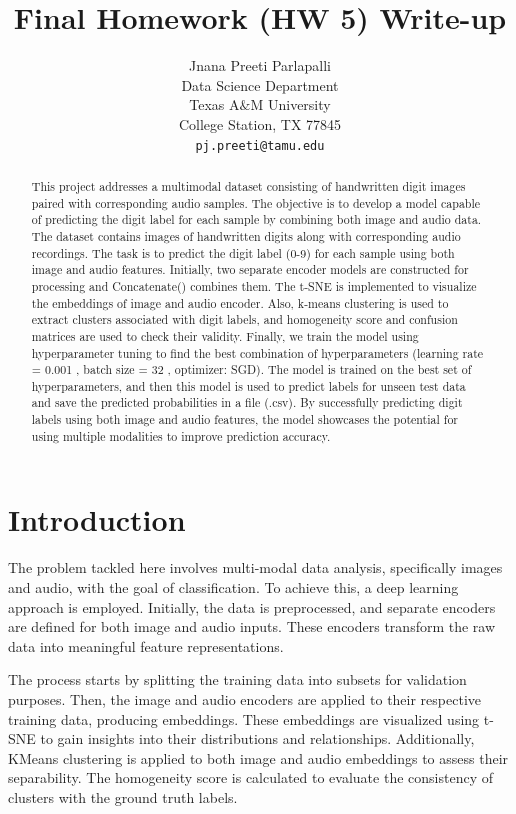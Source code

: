 \documentclass{article}
\title{Final Homework (HW 5) Write-up}
\author{%
  Jnana  Preeti Parlapalli \\
  Data Science Department\\
  Texas A$\&$M University\\
  College Station, TX 77845 \\
  \texttt{pj.preeti@tamu.edu} \\
}
\begin{document}
\maketitle


\begin{abstract}
  This project addresses a multimodal dataset consisting of handwritten digit images paired with corresponding audio samples. The objective is to develop a model capable of predicting the digit label for each sample by combining both image and audio data. The dataset contains images of handwritten digits along with corresponding audio recordings. The task is to predict the digit label (0-9) for each sample using both image and audio features. Initially, two separate encoder models are constructed for processing and  Concatenate() combines them. The t-SNE is implemented to visualize the embeddings of image and audio encoder. Also, k-means clustering is used to extract clusters associated with digit labels, and homogeneity score and confusion matrices are used to check their validity. Finally, we train the model using hyperparameter tuning to find the best combination of hyperparameters (learning rate = 0.001 , batch size = 32 , optimizer: SGD). The model is trained on the best set of hyperparameters, and then this model is used to predict labels for unseen test data and save the predicted probabilities in a file (.csv). By successfully predicting digit labels using both image and audio features, the model showcases the potential for using multiple modalities to improve prediction accuracy.
\end{abstract}


\section{Introduction}

The problem tackled here involves multi-modal data analysis, specifically images and audio, with the goal of classification. To achieve this, a deep learning approach is employed. Initially, the data is preprocessed, and separate encoders are defined for both image and audio inputs. These encoders transform the raw data into meaningful feature representations.

The process starts by splitting the training data into subsets for validation purposes. Then, the image and audio encoders are applied to their respective training data, producing embeddings. These embeddings are visualized using t-SNE to gain insights into their distributions and relationships. Additionally, KMeans clustering is applied to both image and audio embeddings to assess their separability. The homogeneity score is calculated to evaluate the consistency of clusters with the ground truth labels.
\end{document}
